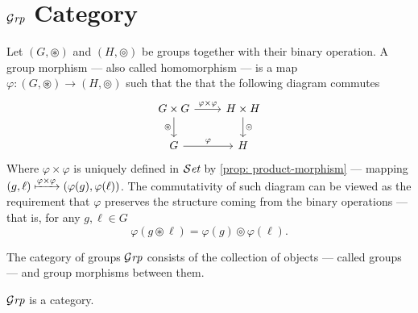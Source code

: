 \section{\texorpdfstring{\({\mathcal{G}\textit{rp}}\)}{Grp} Category}

\begin{definition}\label{def: grp-morphism}
  Let \((G, \circledast)\) and \((H, \circledcirc)\) be groups together with
  their binary operation. A group morphism --- also called homomorphism --- is a
  map \(\varphi: (G, \circledast) \to (H, \circledcirc)\) such that the that the
  following diagram commutes
  \[
    \begin{tikzcd}
      G \times G \ar[d, swap, "\circledast"] \ar[r, "\varphi \times \varphi"]
      &H \times H \ar[d, "\circledcirc"] \\
      G \ar[r, "\varphi"] &H
    \end{tikzcd}
  \]
  Where \(\varphi \times \varphi\) is uniquely defined in \({\mathcal{S}\textit{et}}\) by
  \cref{prop: product-morphism} --- mapping \((g, \ell) \xmapsto{\varphi \times
  \varphi} (\varphi(g), \varphi(\ell))\). The commutativity of such diagram can
  be viewed as the requirement that \(\varphi\) preserves the structure coming
  from the binary operations --- that is, for any \(g, \ell \in G\)
  \[
    \varphi(g \circledast \ell) = \varphi(g) \circledcirc \varphi(\ell).
  \]
\end{definition}

\begin{definition}\label{def: grp}
  The category of groups \({\mathcal{G}\textit{rp}}\) consists of the collection of objects ---
  called groups --- and group morphisms between them.
\end{definition}

\begin{proposition}
  \({\mathcal{G}\textit{rp}}\) is a category.
\end{proposition}

